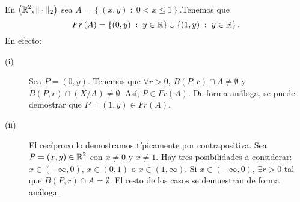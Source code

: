 \begin{eg}
	En $\displaystyle \left(\mathbb{R}^{2}, \| \cdot \|_{2}\right) $ sea $\displaystyle A = \left\{ \left(x,y\right) \; : \; 0 < x \leq 1\right\}  $.Tenemos que  
	\[ Fr\left(A\right) = \left\{ \left(0,y\right)\; : \; y \in \mathbb{R}\right\} \cup \left\{ \left(1,y\right) \; : \; y \in \mathbb{R}\right\} .\]
	En efecto:
	\begin{description}
	\item[(i)] Sea $\displaystyle P = \left(0,y\right) $. Tenemos que $\displaystyle \forall r > 0 $, $\displaystyle B\left(P,r\right) \cap A \neq \emptyset $ y $\displaystyle B\left(P,r\right)\cap \left(X/A\right) \neq \emptyset $. Así, $\displaystyle P \in Fr\left(A\right) $. De forma análoga, se puede demostrar que $\displaystyle P = \left(1,y\right) \in Fr\left(A\right) $.
	\item[(ii)] El recíproco lo demostramos típicamente por contrapositiva. Sea $\displaystyle P = \left(x,y\right) \in \mathbb{R}^{2} $ con $\displaystyle x \neq 0 $ y $\displaystyle x \neq 1 $. Hay tres posibilidades a considerar: $\displaystyle x \in \left(-\infty, 0\right) $, $\displaystyle x \in \left(0,1\right) $ o $\displaystyle x \in \left(1,\infty\right) $. Si $\displaystyle x \in \left(-\infty, 0\right) $, $\displaystyle \exists r > 0 $ tal que $\displaystyle B\left(P,r\right) \cap A = \emptyset $. El resto de los casos se demuestran de forma análoga.
	\end{description}
\end{eg}

